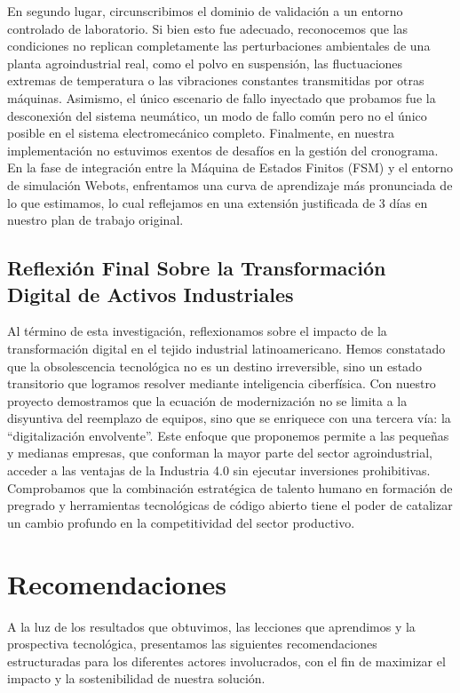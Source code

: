 En segundo lugar, circunscribimos el dominio de validación a un entorno controlado de laboratorio. Si bien esto fue adecuado, reconocemos que las condiciones no replican completamente las perturbaciones ambientales de una planta agroindustrial real, como el polvo en suspensión, las fluctuaciones extremas de temperatura o las vibraciones constantes transmitidas por otras máquinas. Asimismo, el único escenario de fallo inyectado que probamos fue la desconexión del sistema neumático, un modo de fallo común pero no el único posible en el sistema electromecánico completo. Finalmente, en nuestra implementación no estuvimos exentos de desafíos en la gestión del cronograma. En la fase de integración entre la Máquina de Estados Finitos (FSM) y el entorno de simulación Webots, enfrentamos una curva de aprendizaje más pronunciada de lo que estimamos, lo cual reflejamos en una extensión justificada de 3 días en nuestro plan de trabajo original.

\subsection{Reflexión Final Sobre la Transformación Digital de Activos Industriales}

Al término de esta investigación, reflexionamos sobre el impacto de la transformación digital en el tejido industrial latinoamericano. Hemos constatado que la obsolescencia tecnológica no es un destino irreversible, sino un estado transitorio que logramos resolver mediante inteligencia ciberfísica. Con nuestro proyecto demostramos que la ecuación de modernización no se limita a la disyuntiva del reemplazo de equipos, sino que se enriquece con una tercera vía: la \enquote{digitalización envolvente}. Este enfoque que proponemos permite a las pequeñas y medianas empresas, que conforman la mayor parte del sector agroindustrial, acceder a las ventajas de la Industria 4.0 sin ejecutar inversiones prohibitivas. Comprobamos que la combinación estratégica de talento humano en formación de pregrado y herramientas tecnológicas de código abierto tiene el poder de catalizar un cambio profundo en la competitividad del sector productivo.

\section{Recomendaciones}

A la luz de los resultados que obtuvimos, las lecciones que aprendimos y la prospectiva tecnológica, presentamos las siguientes recomendaciones estructuradas para los diferentes actores involucrados, con el fin de maximizar el impacto y la sostenibilidad de nuestra solución.

